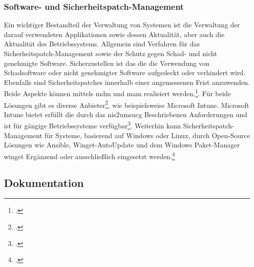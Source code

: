 \documentclass[11pt,a4paper,hidelinks]{article}   %
\begin{document}
            \subsubsection{Software- und Sicherheitspatch-Management}
            Ein wichtiger Bestandteil der Verwaltung von Systemen ist die Verwaltung der darauf verwendeten Applikationen sowie dessen Aktualität, aber auch die Aktualität des Betriebssystems. Allgemein sind Verfahren für das Sicherheitspatch-Management sowie der Schutz gegen Schad- und nicht genehmigte Software. Sicherzustellen ist das die die Verwendung von Schadsoftware oder nicht genehmigter Software aufgedeckt oder verhindert wird. Ebenfalls sind Sicherheitspatches innerhalb einer angemessenen Frist anzuwenden. Beide Aspekte können mittels \gls{mdm} und \gls{mam} realisiert werden.\footcite[Vgl. S. 21 und 118][]{9781509301331}. Für beide Lösungen gibt es diverse Anbieter\footcite[Diverse MDM/MAM anbieter][]{MISSING}, wie beispielsweise Microsoft Intune. Microsoft Intune bietet erfüllt die durch das \gls{nis2umsucg} Beschriebenen Anforderungen und ist für gängige Betriebssysteme verfügbar\footcite[Intune Supported os, Feature Matrix][]{MISSING}. Weiterhin kann Sicherheitspatch-Management für Systeme, basierend auf Windows oder Linux, durch Open-Source Lösungen wie Ansible, Winget-AutoUpdate und dem Windows Paket-Manager winget Ergänzend oder ausschließlich eingesetzt werden.\footcite[][winget etc.]{MISSING}
        \subsection{Dokumentation}
\end{document}
